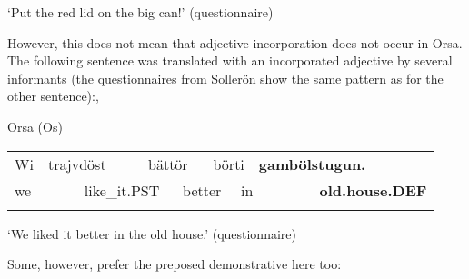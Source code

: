 \begin{styleTranslation}
‘Put the red lid on the big can!’ (questionnaire)

\end{styleTranslation}

\begin{styleBodyTextFirst}
However, this does not mean that adjective incorporation does not occur in Orsa. The following sentence was translated with an incorporated adjective by several informants (the questionnaires from Sollerön show the same pattern as for the other sentence):,

\end{styleBodyTextFirst}

\begin{listWWNumileveli}
\item 

\begin{styleExample}
Orsa (Os)

\end{styleExample}

\end{listWWNumileveli}

\begin{tabular}{llllllllll}
\lsptoprule
Wi & \multicolumn{2}{l}{trajvdöst

} & \multicolumn{2}{l}{bättör

} & \multicolumn{2}{l}{börti

} & \multicolumn{2}{l}{{\bfseries gambölstugun.}

} & \\
\multicolumn{2}{l}{we

} & \multicolumn{2}{l}{like\_it.PST

} & \multicolumn{2}{l}{better

} & \multicolumn{2}{l}{in

} & \multicolumn{2}{l}{{\bfseries old.house.DEF}

}\\
\lspbottomrule
\end{tabular}

\begin{styleTranslation}
‘We liked it better in the old house.’ (questionnaire)

\end{styleTranslation}

\begin{styleBodyTextFirst}
Some, however, prefer the preposed demonstrative here too:

\end{styleBodyTextFirst}

